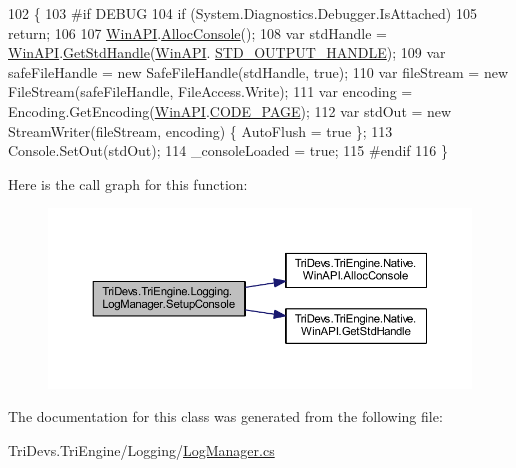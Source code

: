 \begin{DoxyCode}
102         \{
103 \textcolor{preprocessor}{#if DEBUG}
104 \textcolor{preprocessor}{}            \textcolor{keywordflow}{if} (System.Diagnostics.Debugger.IsAttached)
105                 \textcolor{keywordflow}{return};
106 
107             \hyperlink{class_tri_devs_1_1_tri_engine_1_1_native_1_1_win_a_p_i}{WinAPI}.\hyperlink{class_tri_devs_1_1_tri_engine_1_1_native_1_1_win_a_p_i_a8f3b12350e016e847f91d32521efd788}{AllocConsole}();
108             var stdHandle = \hyperlink{class_tri_devs_1_1_tri_engine_1_1_native_1_1_win_a_p_i}{WinAPI}.\hyperlink{class_tri_devs_1_1_tri_engine_1_1_native_1_1_win_a_p_i_a10f79c8b3a9a2c4c5f7322333912cbed}{GetStdHandle}(\hyperlink{class_tri_devs_1_1_tri_engine_1_1_native_1_1_win_a_p_i}{WinAPI}.
      \hyperlink{class_tri_devs_1_1_tri_engine_1_1_native_1_1_win_a_p_i_af25005f0e5e30af231f75210ad4bc09c}{STD\_OUTPUT\_HANDLE});
109             var safeFileHandle = \textcolor{keyword}{new} SafeFileHandle(stdHandle, \textcolor{keyword}{true});
110             var fileStream = \textcolor{keyword}{new} FileStream(safeFileHandle, FileAccess.Write);
111             var encoding = Encoding.GetEncoding(\hyperlink{class_tri_devs_1_1_tri_engine_1_1_native_1_1_win_a_p_i}{WinAPI}.\hyperlink{class_tri_devs_1_1_tri_engine_1_1_native_1_1_win_a_p_i_adc3aadbeadf21e00eb044b0f15867203}{CODE\_PAGE});
112             var stdOut = \textcolor{keyword}{new} StreamWriter(fileStream, encoding) \{ AutoFlush = \textcolor{keyword}{true} \};
113             Console.SetOut(stdOut);
114             \_consoleLoaded = \textcolor{keyword}{true};
115 \textcolor{preprocessor}{#endif}
116 \textcolor{preprocessor}{}        \}
\end{DoxyCode}


Here is the call graph for this function\-:
\nopagebreak
\begin{figure}[H]
\begin{center}
\leavevmode
\includegraphics[width=350pt]{class_tri_devs_1_1_tri_engine_1_1_logging_1_1_log_manager_abbc077826cba4e1ab1ca47c53ab74fc0_cgraph}
\end{center}
\end{figure}




The documentation for this class was generated from the following file\-:\begin{DoxyCompactItemize}
\item 
Tri\-Devs.\-Tri\-Engine/\-Logging/\hyperlink{_log_manager_8cs}{Log\-Manager.\-cs}\end{DoxyCompactItemize}
